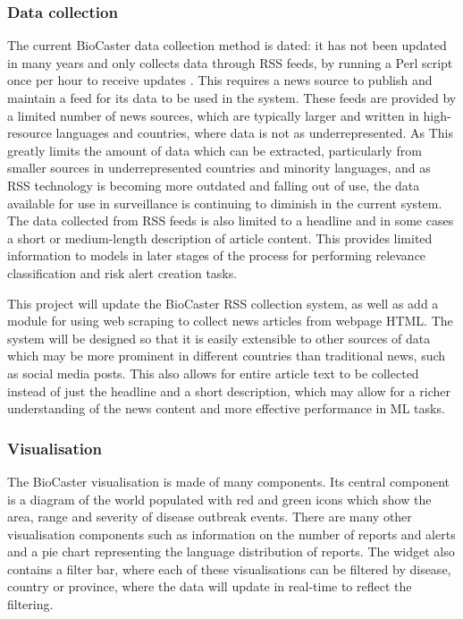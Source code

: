 \documentclass{l4proj}
\begin{document}
\subsubsection{Data collection} \hfill \par
The current BioCaster data collection method is dated: it has not been updated in many years and only collects data through RSS feeds, by running a Perl script once per hour to receive updates \citep{collier2008biocaster}. This requires a news source to publish and maintain a feed for its data to be used in the system. These feeds are provided by a limited number of news sources, which are typically larger and written in high-resource languages and countries, where data is not as underrepresented. As  This greatly limits the amount of data which can be extracted, particularly from smaller sources in underrepresented countries and minority languages, and as RSS technology is becoming more outdated and falling out of use, the data available for use in surveillance is continuing to diminish in the current system. The data collected from RSS feeds is also limited to a headline and in some cases a short or medium-length description of article content. This provides limited information to models in later stages of the process for performing relevance classification and risk alert creation tasks. \par
This project will update the BioCaster RSS collection system, as well as add a module for using web scraping to collect news articles from webpage HTML. The system will be designed so that it is easily extensible to other sources of data which may be more prominent in different countries than traditional news, such as social media posts. This also allows for entire article text to be collected instead of just the headline and a short description, which may allow for a richer understanding of the news content and more effective performance in ML tasks.
\subsubsection{Visualisation} \hfill \par
The BioCaster visualisation is made of many components. Its central component is a diagram of the world populated with red and green icons which show the area, range and severity of disease outbreak events. There are many other visualisation components such as information on the number of reports and alerts and a pie chart representing the language distribution of reports. The widget also contains a filter bar, where each of these visualisations can be filtered by disease, country or province, where the data will update in real-time to reflect the filtering. 
\end{document}
